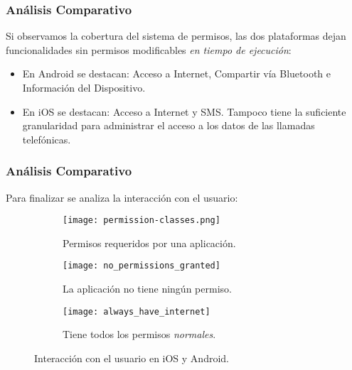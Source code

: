 \begin{frame}
 \frametitle{Análisis Comparativo}
Si observamos la cobertura del sistema de permisos, \pause las dos plataformas dejan funcionalidades sin permisos modificables \emph{en tiempo de ejecución}:\pause
  \begin{itemize}[<+->]
   \item En Android se destacan: Acceso a Internet, Compartir vía Bluetooth e Información del Dispositivo.
   \item En iOS se destacan: Acceso a Internet y SMS. Tampoco tiene la suficiente granularidad para administrar el acceso a los datos de las llamadas telefónicas.
  \end{itemize}
\end{frame}
\begin{frame}
 \frametitle{Análisis Comparativo}
\small {Para finalizar se analiza la interacción con el usuario:}\pause
\begin{figure}
	\centering
	\begin{subfigure}{.23\linewidth}
		\texttt{[image: permission-classes.png]}
		\caption{Permisos requeridos por una aplicación.}
		\label{fig:ch05:ios_all_permissions}
	\end{subfigure}\pause
	\begin{subfigure}{.23\linewidth}
		\texttt{[image: no\_permissions\_granted]}
		\caption{La aplicación no tiene ningún permiso.}
		\label{fig:ch05:without_permissions}
	\end{subfigure}\pause
	\begin{subfigure}{.23\linewidth}
		\texttt{[image: always\_have\_internet]}
		\caption{Tiene todos los permisos \emph{normales}.}
		\label{fig:ch05:always_have_internet}
	\end{subfigure}
	\caption{Interacción con el usuario en iOS y Android.}
\end{figure}
\end{frame}